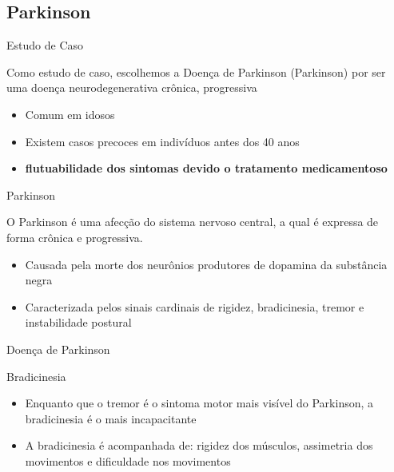 \documentclass{beamer}
\begin{document}
\subsection{Parkinson}
\begin{frame}{Estudo de Caso}
  \begin{block}{}
   Como estudo de caso, escolhemos a Doença de Parkinson (Parkinson) por ser uma doença neurodegenerativa crônica, progressiva 
   \begin{itemize}
    \item Comum em idosos
    \item Existem casos precoces em indivíduos antes dos 40 anos
    \item \textbf{flutuabilidade dos sintomas devido o tratamento medicamentoso}
   \end{itemize}
  \end{block}
\end{frame}


\begin{frame}{Parkinson}
  \begin{block}{}
    O Parkinson é uma afecção do sistema nervoso central, a qual é expressa de forma crônica e progressiva. 
      \begin{itemize}
       \item Causada pela morte dos neurônios produtores de dopamina da substância negra~\cite{protpar010}
       \item Caracterizada pelos sinais cardinais de rigidez, bradicinesia, tremor e instabilidade postural~\cite{jankovic2008}
      \end{itemize}
  \end{block}
\end{frame}


\begin{frame}{Doença de Parkinson}
  \begin{block}{Bradicinesia}
      \begin{itemize}
	\item Enquanto que o tremor é o sintoma motor mais visível do Parkinson, a bradicinesia é o mais incapacitante
	\item A bradicinesia é acompanhada de: rigidez dos músculos, assimetria dos movimentos e dificuldade nos movimentos
	\end{itemize}
  \end{block}
\end{frame}
  
\end{document}
